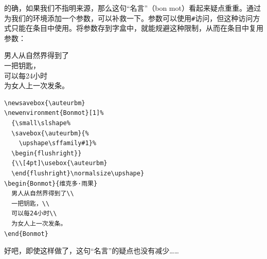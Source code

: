 的确，如果我们不指明来源，那么这句“名言”（bon mot）看起来疑点重重。通过为我们的环境添加一个参数，可以补救一下。参数可以使用\verb|#|访问，但这种访问方式只能在条目中使用。将参数存到字盒中，就能规避这种限制，从而在条目中复用参数：

\begin{codelist}[4.24]{
  \newsavebox{\auteurbm}
\newenvironment{Bonmot}[1]%
  {\small\slshape%
  \savebox{\auteurbm}{%
    \upshape\sffamily#1}%
  \begin{flushright}}
  {\\[4pt]\usebox{\auteurbm}
  \end{flushright}\normalsize\upshape}
\begin{Bonmot}{维克多·雨果}
  男人从自然界得到了\\
  一把钥匙，\\
  可以每24小时\\
  为女人上一次发条。
\end{Bonmot}
}\begin{verbatim}
\newsavebox{\auteurbm}
\newenvironment{Bonmot}[1]%
  {\small\slshape%
  \savebox{\auteurbm}{%
    \upshape\sffamily#1}%
  \begin{flushright}}
  {\\[4pt]\usebox{\auteurbm}
  \end{flushright}\normalsize\upshape}
\begin{Bonmot}{维克多·雨果}
  男人从自然界得到了\\
  一把钥匙，\\
  可以每24小时\\
  为女人上一次发条。
\end{Bonmot}
\end{verbatim}
\end{codelist}

好吧，即使这样做了，这句“名言”的疑点也没有减少……
